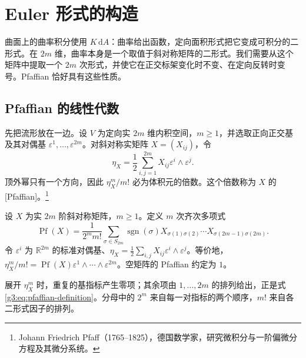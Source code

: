 
% 
% 

\section{Euler 形式的构造}
\label{g3:sec:1701}

曲面上的曲率积分使用 \(K\,\mathrm dA\)：曲率给出函数，定向面积形式把它变成可积分的二形式。在 \(2m\) 维，曲率本身是一个取值于斜对称矩阵的二形式。我们需要从这个矩阵中提取一个 \(2m\) 次形式，并使它在正交标架变化时不变、在定向反转时变号。Pfaffian 恰好具有这些性质。

\subsection{Pfaffian 的线性代数}
\label{g3:subsec:1701:01}
先把流形放在一边。设 \(V\) 为定向实 \(2m\) 维内积空间，\(m\ge1\)，并选取正向正交基及其对偶基 \(\varepsilon^1,\ldots,\varepsilon^{2m}\)。对斜对称实矩阵 \(X=(X_{ij})\)，令
\[
	\eta_X=\frac12\sum_{i,j=1}^{2m}X_{ij}\varepsilon^i\wedge\varepsilon^j.
\]
顶外幂只有一个方向，因此 \(\eta_X^m/m!\) 必为体积元的倍数。这个倍数称为 \(X\) 的[Pfaffian]。\footnote{Johann Friedrich Pfaff（1765--1825），德国数学家，研究微积分与一阶偏微分方程及其微分系统。}
\begin{definition}\label{g3:def:pfaffian}
	设 \(X\) 为实 \(2m\) 阶斜对称矩阵，\(m\ge1\)。定义 \(m\) 次齐次多项式
	\begin{equation}\label{g3:eq:pfaffian-definition}
		\operatorname{Pf}(X)
		=\frac1{2^m m!}\sum_{\sigma\in S_{2m}}\operatorname{sgn}(\sigma)
		X_{\sigma(1)\sigma(2)}\cdots X_{\sigma(2m-1)\sigma(2m)}.
	\end{equation}
	令 \(\varepsilon^i\) 为 \(\mathbb R^{2m}\) 的标准对偶基、\(\eta_X=\tfrac12\sum_{i,j}X_{ij}\varepsilon^i\wedge\varepsilon^j\)。等价地，\(\eta_X^m/m!=\operatorname{Pf}(X)\varepsilon^1\wedge\cdots\wedge\varepsilon^{2m}\)。空矩阵的 Pfaffian 约定为 \(1\)。
\end{definition}

展开 \(\eta_X^m\) 时，重复的基指标产生零项；其余项由 \(1,\ldots,2m\) 的排列给出，正是式\eqref{g3:eq:pfaffian-definition}。分母中的 \(2^m\) 来自每一对指标的两个顺序，\(m!\) 来自各二形式因子的排列。

